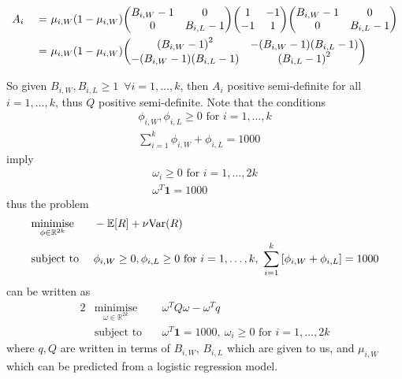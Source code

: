 \documentclass[11pt]{article} %
\let\originalleft\left
\let\originalright\right
\renewcommand{\left}{\mathopen{}\mathclose\bgroup\originalleft}
\renewcommand{\right}{\aftergroup\egroup\originalright}
\begin{document}
\begin{alignat*}{2}
	& A_i &\ =\ &
	\mu_{i, W}\left(1-\mu_{i, W}\right)	
	\begin{pmatrix}
	B_{i, W}-1 & 0\\
	0 & B_{i, L}-1
	\end{pmatrix}
	\begin{pmatrix}
		1& -1 \\
		-1& 1 \\
	\end{pmatrix}
	\begin{pmatrix}
	B_{i, W}-1 & 0\\
	0 & B_{i, L}-1
	\end{pmatrix} \\
	& &\ =\ & \mu_{i, W}\left(1-\mu_{i, W}\right)
	\begin{pmatrix}
		\left(B_{i, W}-1\right)^2 & -\left(B_{i, W}-1\right)\left(B_{i, L}-1\right)\\
		-\left(B_{i, W}-1\right)\left(B_{i, L}-1\right) & \left(B_{i, L}-1\right)^2
	\end{pmatrix}
\end{alignat*}

So given $B_{i,W}, B_{i,L} \geq 1 \ \;\forall i=1,\ldots,k$, then $A_i$ positive semi-definite for all $i=1,\ldots,k$, thus $Q$ positive semi-definite. Note that the conditions 
\begin{gather*}
	\phi_{i, W}, \phi_{i, L} \geq 0 \text{ for }i=1,\ldots,k\\
	\sum_{i=1}^{k}{\phi_{i, W} + \phi_{i, L}} = 1000
\end{gather*}
imply
\begin{gather*}
	\omega_{i} \geq 0 \text{ for }i=1,\ldots,2k\\
	\omega^T\mathbf{1} = 1000
\end{gather*}
thus the problem
\begin{alignat*}{2}
	&\underset{\phi \in \mathbb{R}^{2k}}{\text{minimise}} &\ & -\mathbb{E}\left[R\right] + \nu\text{Var}\left(R\right) \\
	&\text{subject to} &\ & \phi_{i, W}\geq 0, \phi_{i, L} \geq 0 \text{ for }i=1,\ldots,k, \ \sum_{i=1}^{k}{\left[\phi_{i, W} + \phi_{i, L}\right]} = 1000
\end{alignat*}
can be written as
\begin{alignat*}{2}
	&\underset{\omega \in \mathbb{R}^{2k}}{\text{minimise}} &\ & \omega^T Q \omega - \omega^Tq \\
	&\text{subject to} &\ & \omega^T \mathbf{1} = 1000,\ \omega_{i}\geq 0\text{ for }i=1,\ldots,2k
\end{alignat*}
where $q, Q$ are written in terms of $B_{i, W}$, $B_{i, L}$ which are given to us, and $\mu_{i, W}$ which can be predicted from a logistic regression model.
\end{document}
